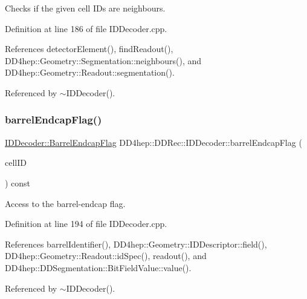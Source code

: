 Checks if the given cell I\+Ds are neighbours. 



Definition at line 186 of file I\+D\+Decoder.\+cpp.



References detector\+Element(), find\+Readout(), D\+D4hep\+::\+Geometry\+::\+Segmentation\+::neighbours(), and D\+D4hep\+::\+Geometry\+::\+Readout\+::segmentation().



Referenced by $\sim$\+I\+D\+Decoder().

\hypertarget{class_d_d4hep_1_1_d_d_rec_1_1_i_d_decoder_a05f2fa448c0f8b4a3bf6413a16801f5e}{}\label{class_d_d4hep_1_1_d_d_rec_1_1_i_d_decoder_a05f2fa448c0f8b4a3bf6413a16801f5e} 
\subsubsection{\texorpdfstring{barrel\+Endcap\+Flag()}{barrelEndcapFlag()}}
{\footnotesize\ttfamily \hyperlink{class_d_d4hep_1_1_d_d_rec_1_1_i_d_decoder_1_1_barrel_endcap_flag}{I\+D\+Decoder\+::\+Barrel\+Endcap\+Flag} D\+D4hep\+::\+D\+D\+Rec\+::\+I\+D\+Decoder\+::barrel\+Endcap\+Flag (\begin{DoxyParamCaption}\item[{const \hyperlink{namespace_d_d4hep_1_1_d_d_rec_af5cecc2e566eeaedb430b92df23971d4}{Cell\+ID} \&}]{cell\+ID }\end{DoxyParamCaption}) const}



Access to the barrel-\/endcap flag. 



Definition at line 194 of file I\+D\+Decoder.\+cpp.



References barrel\+Identifier(), D\+D4hep\+::\+Geometry\+::\+I\+D\+Descriptor\+::field(), D\+D4hep\+::\+Geometry\+::\+Readout\+::id\+Spec(), readout(), and D\+D4hep\+::\+D\+D\+Segmentation\+::\+Bit\+Field\+Value\+::value().



Referenced by $\sim$\+I\+D\+Decoder().

\hypertarget{class_d_d4hep_1_1_d_d_rec_1_1_i_d_decoder_ac5bd93061aef3850d7aca8711e8a507f}{}\label{class_d_d4hep_1_1_d_d_rec_1_1_i_d_decoder_ac5bd93061aef3850d7aca8711e8a507f} 
